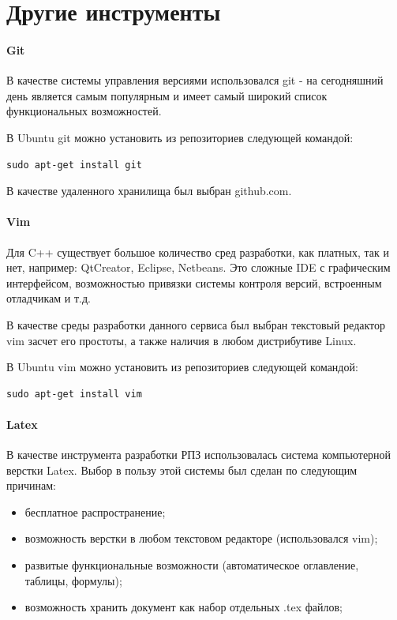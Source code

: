 \section{Другие инструменты}
\paragraph{Git}

В качестве системы управления версиями использовался git - на сегодняшний день является самым популярным и имеет самый широкий список функциональных возможностей.

В Ubuntu git можно установить из репозиториев следующей командой:
\begin{lstlisting}
sudo apt-get install git
\end{lstlisting}

В качестве удаленного хранилища был выбран github.com.

\paragraph{Vim}

Для C++ существует большое количество сред разработки, как платных, так и нет, например: QtCreator, Eclipse, Netbeans. Это сложные IDE с графическим интерфейсом, возможностью привязки системы контроля версий, встроенным отладчикам и т.д.

В качестве среды разработки данного сервиса был выбран текстовый редактор vim засчет его простоты, а также наличия в любом дистрибутиве Linux.

В Ubuntu vim можно установить из репозиториев следующей командой:
\begin{lstlisting}
sudo apt-get install vim
\end{lstlisting}

\paragraph{Latex}

В качестве инструмента разработки РПЗ использовалась система компьютерной верстки Latex. Выбор в пользу этой системы был сделан по следующим причинам:
\begin{itemize}
\item бесплатное распространение;
\item возможность верстки в любом текстовом редакторе (использовался vim);
\item развитые функциональные возможности (автоматическое оглавление, таблицы, формулы);
\item возможность хранить документ как набор отдельных .tex файлов;
\end{itemize}


